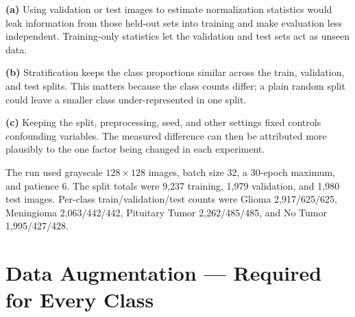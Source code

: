\documentclass[12pt,a4paper]{article}
\begin{document}
\begin{answerbox}
\textbf{(a)} Using validation or test images to estimate normalization statistics
would leak information from those held-out sets into training and make evaluation
less independent. Training-only statistics let the validation and test sets act
as unseen data.\par
\textbf{(b)} Stratification keeps the class proportions similar across the
train, validation, and test splits. This matters because the class counts differ;
a plain random split could leave a smaller class under-represented in one split.\par
\textbf{(c)} Keeping the split, preprocessing, seed, and other settings fixed
controls confounding variables. The measured difference can then be attributed
more plausibly to the one factor being changed in each experiment.
\par
The run used grayscale $128\times128$ images, batch size 32, a 30-epoch maximum,
and patience 6. The split totals were 9,237 training, 1,979 validation, and 1,980
test images. Per-class train/validation/test counts were Glioma 2,917/625/625,
Meningioma 2,063/442/442, Pituitary Tumor 2,262/485/485, and No Tumor
1,995/427/428.
\end{answerbox}

\section{Data Augmentation --- Required for Every Class}
\end{document}
